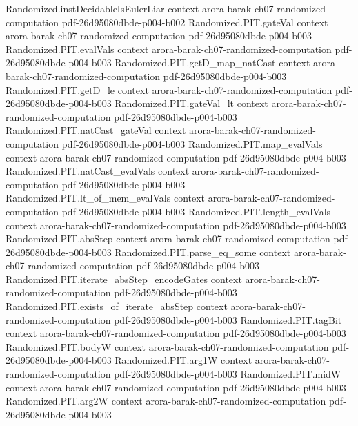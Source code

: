 \begin{theorem}
\proofstep
  {Randomized.instDecidableIsEulerLiar}
  {context}
  {arora-barak-ch07-randomized-computation}
  {pdf-26d95080dbde-p004-b002}
\proofstep
  {Randomized.PIT.gateVal}
  {context}
  {arora-barak-ch07-randomized-computation}
  {pdf-26d95080dbde-p004-b003}
\proofstep
  {Randomized.PIT.evalVals}
  {context}
  {arora-barak-ch07-randomized-computation}
  {pdf-26d95080dbde-p004-b003}
\proofstep
  {Randomized.PIT.getD_map_natCast}
  {context}
  {arora-barak-ch07-randomized-computation}
  {pdf-26d95080dbde-p004-b003}
\proofstep
  {Randomized.PIT.getD_le}
  {context}
  {arora-barak-ch07-randomized-computation}
  {pdf-26d95080dbde-p004-b003}
\proofstep
  {Randomized.PIT.gateVal_lt}
  {context}
  {arora-barak-ch07-randomized-computation}
  {pdf-26d95080dbde-p004-b003}
\proofstep
  {Randomized.PIT.natCast_gateVal}
  {context}
  {arora-barak-ch07-randomized-computation}
  {pdf-26d95080dbde-p004-b003}
\proofstep
  {Randomized.PIT.map_evalVals}
  {context}
  {arora-barak-ch07-randomized-computation}
  {pdf-26d95080dbde-p004-b003}
\proofstep
  {Randomized.PIT.natCast_evalVals}
  {context}
  {arora-barak-ch07-randomized-computation}
  {pdf-26d95080dbde-p004-b003}
\proofstep
  {Randomized.PIT.lt_of_mem_evalVals}
  {context}
  {arora-barak-ch07-randomized-computation}
  {pdf-26d95080dbde-p004-b003}
\proofstep
  {Randomized.PIT.length_evalVals}
  {context}
  {arora-barak-ch07-randomized-computation}
  {pdf-26d95080dbde-p004-b003}
\proofstep
  {Randomized.PIT.absStep}
  {context}
  {arora-barak-ch07-randomized-computation}
  {pdf-26d95080dbde-p004-b003}
\proofstep
  {Randomized.PIT.parse_eq_some}
  {context}
  {arora-barak-ch07-randomized-computation}
  {pdf-26d95080dbde-p004-b003}
\proofstep
  {Randomized.PIT.iterate_absStep_encodeGates}
  {context}
  {arora-barak-ch07-randomized-computation}
  {pdf-26d95080dbde-p004-b003}
\proofstep
  {Randomized.PIT.exists_of_iterate_absStep}
  {context}
  {arora-barak-ch07-randomized-computation}
  {pdf-26d95080dbde-p004-b003}
\proofstep
  {Randomized.PIT.tagBit}
  {context}
  {arora-barak-ch07-randomized-computation}
  {pdf-26d95080dbde-p004-b003}
\proofstep
  {Randomized.PIT.bodyW}
  {context}
  {arora-barak-ch07-randomized-computation}
  {pdf-26d95080dbde-p004-b003}
\proofstep
  {Randomized.PIT.arg1W}
  {context}
  {arora-barak-ch07-randomized-computation}
  {pdf-26d95080dbde-p004-b003}
\proofstep
  {Randomized.PIT.midW}
  {context}
  {arora-barak-ch07-randomized-computation}
  {pdf-26d95080dbde-p004-b003}
\proofstep
  {Randomized.PIT.arg2W}
  {context}
  {arora-barak-ch07-randomized-computation}
  {pdf-26d95080dbde-p004-b003}

\end{theorem}
